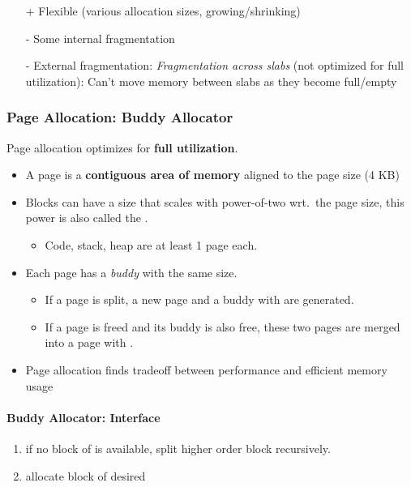 \begin{itemize}
    \item[+] Flexible (various allocation sizes, growing/shrinking)
    \item[-] Some internal fragmentation
    \item[-] External fragmentation: \textit{Fragmentation across slabs} (not optimized for full utilization): Can't move memory between slabs as they become full/empty
\end{itemize}

\subsubsection{Page Allocation: Buddy Allocator}
Page allocation optimizes for \textbf{full utilization}.
\begin{itemize}
    \item A page is a \textbf{contiguous area of memory} aligned to the page size (4 KB)
    \item Blocks can have a size that scales with power-of-two wrt.\ the page size, this power is also called the .
          \begin{itemize}
              \item Code, stack, heap are at least 1 page each.
          \end{itemize}
    \item Each page has a \textit{buddy} with the same size.
          \begin{itemize}
              \item If a page is split, a new page and a buddy with  are generated.
              \item If a page is freed and its buddy is also free, these two pages are merged into a page with .
          \end{itemize}
    \item Page allocation finds tradeoff between performance and efficient memory usage
\end{itemize}

\paragraph{Buddy Allocator: Interface}
\begin{enumerate}
    \item if no block of  is available, split higher order block recursively.
    \item allocate block of desired 
\end{enumerate}

